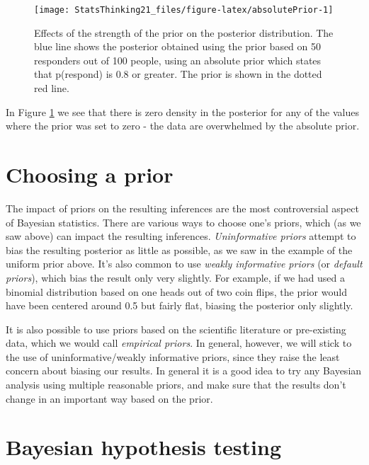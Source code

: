 \documentclass[]{book}
\theoremstyle{definition}
\theoremstyle{definition}
\theoremstyle{definition}
\theoremstyle{remark}
\begin{document}
\begin{figure}
\texttt{[image: StatsThinking21\_files/figure-latex/absolutePrior-1]} \caption{Effects of the strength of the prior on the posterior distribution. The blue line shows the posterior obtained using the prior based on 50 responders out of 100 people, using an absolute prior which states that p(respond) is 0.8 or greater.  The prior is shown in the dotted red line. }\label{fig:absolutePrior}
\end{figure}

In Figure \ref{fig:absolutePrior} we see that there is zero density in
the posterior for any of the values where the prior was set to zero -
the data are overwhelmed by the absolute prior.

\section{Choosing a prior}\label{choosing-a-prior}

The impact of priors on the resulting inferences are the most
controversial aspect of Bayesian statistics. There are various ways to
choose one's priors, which (as we saw above) can impact the resulting
inferences. \emph{Uninformative priors} attempt to bias the resulting
posterior as little as possible, as we saw in the example of the uniform
prior above. It's also common to use \emph{weakly informative priors}
(or \emph{default priors}), which bias the result only very slightly.
For example, if we had used a binomial distribution based on one heads
out of two coin flips, the prior would have been centered around 0.5 but
fairly flat, biasing the posterior only slightly.

It is also possible to use priors based on the scientific literature or
pre-existing data, which we would call \emph{empirical priors}. In
general, however, we will stick to the use of uninformative/weakly
informative priors, since they raise the least concern about biasing our
results. In general it is a good idea to try any Bayesian analysis using
multiple reasonable priors, and make sure that the results don't change
in an important way based on the prior.

\section{Bayesian hypothesis testing}\label{bayesian-hypothesis-testing}
\end{document}
